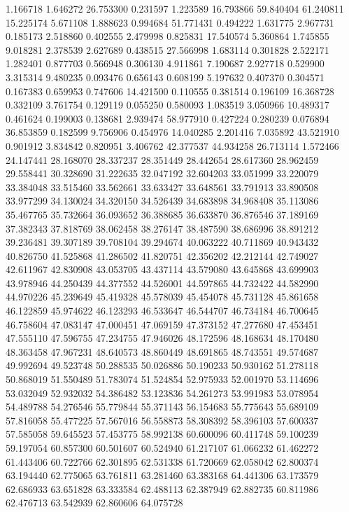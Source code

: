 1.166718
1.646272
26.753300
0.231597
1.223589
16.793866
59.840404
61.240811
15.225174
5.671108
1.888623
0.994684
51.771431
0.494222
1.631775
2.967731
0.185173
2.518860
0.402555
2.479998
0.825831
17.540574
5.360864
1.745855
9.018281
2.378539
2.627689
0.438515
27.566998
1.683114
0.301828
2.522171
1.282401
0.877703
0.566948
0.306130
4.911861
7.190687
2.927718
0.529900
3.315314
9.480235
0.093476
0.656143
0.608199
5.197632
0.407370
0.304571
0.167383
0.659953
0.747606
14.421500
0.110555
0.381514
0.196109
16.368728
0.332109
3.761754
0.129119
0.055250
0.580093
1.083519
3.050966
10.489317
0.461624
0.199003
0.138681
2.939474
58.977910
0.427224
0.280239
0.076894
36.853859
0.182599
9.756906
0.454976
14.040285
2.201416
7.035892
43.521910
0.901912
3.834842
0.820951
3.406762
42.377537
44.934258
26.713114
1.572466
24.147441
28.168070
28.337237
28.351449
28.442654
28.617360
28.962459
29.558441
30.328690
31.222635
32.047192
32.604203
33.051999
33.220079
33.384048
33.515460
33.562661
33.633427
33.648561
33.791913
33.890508
33.977299
34.130024
34.320150
34.526439
34.683898
34.968408
35.113086
35.467765
35.732664
36.093652
36.388685
36.633870
36.876546
37.189169
37.382343
37.818769
38.062458
38.276147
38.487590
38.686996
38.891212
39.236481
39.307189
39.708104
39.294674
40.063222
40.711869
40.943432
40.826750
41.525868
41.286502
41.820751
42.356202
42.212144
42.749027
42.611967
42.830908
43.053705
43.437114
43.579080
43.645868
43.699903
43.978946
44.250439
44.377552
44.526001
44.597865
44.732422
44.582990
44.970226
45.239649
45.419328
45.578039
45.454078
45.731128
45.861658
46.122859
45.974622
46.123293
46.533647
46.544707
46.734184
46.700645
46.758604
47.083147
47.000451
47.069159
47.373152
47.277680
47.453451
47.555110
47.596755
47.234755
47.946026
48.172596
48.168634
48.170480
48.363458
47.967231
48.640573
48.860449
48.691865
48.743551
49.574687
49.992694
49.523748
50.288535
50.026886
50.190233
50.930162
51.278118
50.868019
51.550489
51.783074
51.524854
52.975933
52.001970
53.114696
53.032049
52.932032
54.386482
53.123836
54.261273
53.991983
53.078954
54.489788
54.276546
55.779844
55.371143
56.154683
55.775643
55.689109
57.816058
55.477225
57.567016
56.558873
58.308392
58.396103
57.600337
57.585058
59.645523
57.453775
58.992138
60.600096
60.411748
59.100239
59.197054
60.857300
60.501607
60.524940
61.217107
61.066232
61.462272
61.443406
60.722766
62.301895
62.531338
61.720669
62.058042
62.800374
63.194440
62.775065
63.761811
63.281460
63.383168
64.441306
63.173579
62.686933
63.651828
63.333584
62.488113
62.387949
62.882735
60.811986
62.476713
63.542939
62.860606
64.075728
